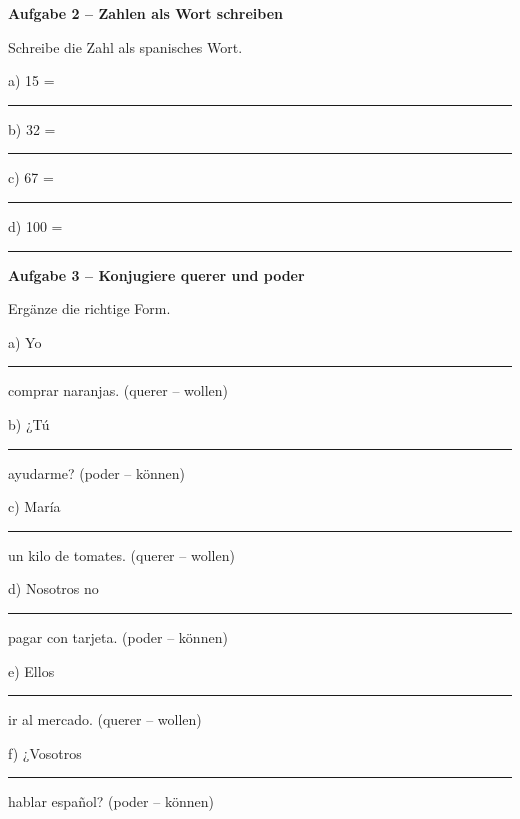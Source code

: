 \documentclass[11pt, a4paper]{article}
\newcommand{\fachfarbe}{spanisch}
\newcommand{\punktebox}[1]{\hfill\fbox{\small \_/#1}}
\newcommand{\luecke}[1]{\rule{#1}{0.4pt}}
\newenvironment{aufgabe}[1]{%
    \needspace{5\baselineskip}%
    \nopagebreak[4]%
    \vspace{10pt}
    \noindent\textbf{\textcolor{\fachfarbe}{Aufgabe #1}}
    \nopagebreak[4]%
    \vspace{5pt}
    \nopagebreak[4]%
    \begin{list}{}{\leftmargin=0pt}
    \item[]
}{%
    \end{list}
}
\newcommand{\es}[1]{\textcolor{\fachfarbe}{\textbf{#1}}}
\begin{document}
\begin{aufgabe}{2 -- Zahlen als Wort schreiben}
Schreibe die Zahl als spanisches Wort. \punktebox{4}
\end{aufgabe}

\noindent
a) 15 = \luecke{4cm}

\vspace{0.8em}

\noindent
b) 32 = \luecke{4cm}

\vspace{0.8em}

\noindent
c) 67 = \luecke{4cm}

\vspace{0.8em}

\noindent
d) 100 = \luecke{4cm}

\vspace{15pt}


\begin{aufgabe}{3 -- Konjugiere \es{querer} und \es{poder}}
Ergänze die richtige Form. \punktebox{6}
\end{aufgabe}

\noindent
a) Yo \luecke{2.5cm} comprar naranjas. \hfill (querer -- wollen)

\vspace{0.8em}

\noindent
b) ¿Tú \luecke{2.5cm} ayudarme? \hfill (poder -- können)

\vspace{0.8em}

\noindent
c) María \luecke{2.5cm} un kilo de tomates. \hfill (querer -- wollen)

\vspace{0.8em}

\noindent
d) Nosotros no \luecke{2.5cm} pagar con tarjeta. \hfill (poder -- können)

\vspace{0.8em}

\noindent
e) Ellos \luecke{2.5cm} ir al mercado. \hfill (querer -- wollen)

\vspace{0.8em}

\noindent
f) ¿Vosotros \luecke{2.5cm} hablar español? \hfill (poder -- können)

\vspace{15pt}
\end{document}
